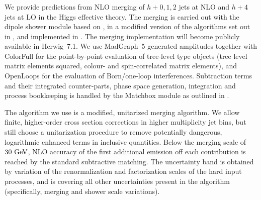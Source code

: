 \subsubsection{\Herwig}
\label{sec:hjetscomp:tools:mc:herwig}

We provide predictions from NLO merging of $h+0,1,2$ jets at NLO and $h+4$
jets at LO in the Higgs effective theory. The merging is carried out with the
\Herwig \ \cite{Bellm:2015jjp} dipole shower module based on
\cite{Platzer:2009jq,Platzer:2011bc}, in a modified version of the algorithms
set out in \cite{Platzer:2012bs,Lonnblad:2012ix}, and implemented in
\cite{Bellm:thesis,Bellm:2016xxx}. The merging implementation will become
publicly available in \textsf{Herwig~7.1}. We use \textsf{MadGraph~5}
\cite{Alwall:2011uj} generated amplitudes together with \textsf{ColorFull}
\cite{Sjodahl:2014opa} for the point-by-point evaluation of tree-level type
objects (tree level matrix elements squared, colour- and spin-correlated
matrix elements), and \textsf{OpenLoops} \cite{Cascioli:2011va} for the
evaluation of Born/one-loop interferences.  Subtraction terms and their
integrated counter-parts, phase space generation, integration and process
bookkeeping is handled by the \textsf{Matchbox} module as outlined in
\cite{Bellm:2015jjp}.

The algorithm we use is a modified, unitarized merging algorithm. We allow
finite, higher-order cross section corrections in higher multiplicity jet
bins, but still choose a unitarization procedure to remove potentially
dangerous, logarithmic enhanced terms in inclusive quantities. Below the
merging scale of $30\ {\rm GeV}$, NLO accuracy of the first additional
emission off each contribution is reached by the standard subtractive
matching. The uncertainty band is obtained by variation of the renormalization
and factorization scales of the hard input processes, and is covering all
other uncertainties present in the algorithm (specifically, merging and shower
scale variations).
